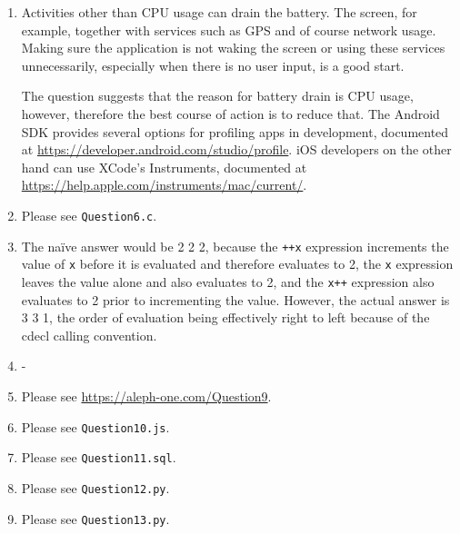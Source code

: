 \documentclass{article}
\begin{document}
\begin{enumerate}[start=0]
\item Activities other than CPU usage can drain the battery. The screen, for example, together with services such as GPS and of course network usage. Making sure the application is not waking the screen or using these services unnecessarily, especially when there is no user input, is a good start.

The question suggests that the reason for battery drain is CPU usage, however, therefore the best course of action is to reduce that. The Android SDK provides several options for profiling apps in development, documented at \url{https://developer.android.com/studio/profile}. iOS developers on the other hand can use XCode's Instruments, documented at \url{https://help.apple.com/instruments/mac/current/}.

\item Please see \texttt{Question6.c}.

\item The na\"{i}ve answer would be 2 2 2, because the \texttt{++x} expression increments the value of \texttt{x} before it is evaluated and therefore evaluates to 2, the \texttt{x} expression leaves the value alone and also evaluates to 2, and the \texttt{x++} expression also evaluates to 2 prior to incrementing the value. However, the actual answer is 3 3 1, the order of evaluation being effectively right to left because of the cdecl calling convention.

\item -

\item Please see \url{https://aleph-one.com/Question9}.

\item Please see \texttt{Question10.js}.

\item Please see \texttt{Question11.sql}. 

\item Please see \texttt{Question12.py}. 

\item Please see \texttt{Question13.py}. 

\end{enumerate}
\end{document}
